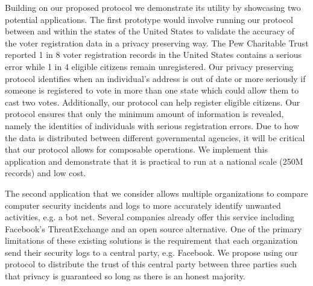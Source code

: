 \documentclass[11pt,letterpaper]{article}
\begin{document}
Building on our proposed protocol we demonstrate its utility by showcasing two potential applications. The first prototype would involve running our protocol between and within the states of the United States to validate the accuracy of the voter registration data in a privacy preserving way. The Pew Charitable Trust\cite{pew} reported 1 in 8 voter registration records in the United States contains a serious error while 1 in 4 eligible citizens remain unregistered. Our privacy preserving protocol identifies when an individual's address is out of date or more seriously if someone is registered to vote in more than one state which could allow them to cast two votes. 
\iffullversion
Additionally, our protocol can help register eligible citizens. Our protocol ensures that only the minimum amount of information is revealed, namely the identities of individuals with serious registration errors.
\fi 
Due to how the data is distributed between different governmental agencies, it will be critical that our protocol allows for composable operations. We implement this application and demonstrate that it is practical to run at a national scale (250M records) and low cost.

The second application that we consider allows multiple organizations to compare computer security incidents and logs to more accurately identify unwanted activities, e.g. a bot net. Several companies already offer this service including Facebook's ThreatExchange\cite{threat} and an open source alternative\cite{alt_threat}. One of the primary limitations of these existing solutions is the requirement that each organization send their security logs to a central party, e.g. Facebook. We propose using our protocol to distribute the trust of this central party between three parties such that privacy is guaranteed so long as there is an honest majority.
\end{document}

